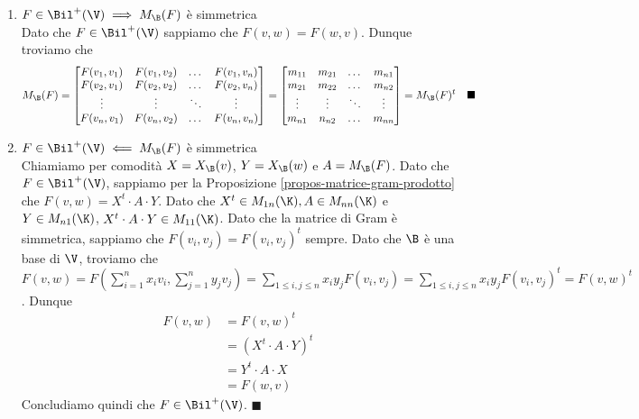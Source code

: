 \documentclass[11pt, a4paper, titlepage, oneside]{scrbook}
\begin{document}
\begin{enumerate}[label=\arabic*°]
    \item $F \in \Bil^+(\V) \implies M_\B(F)$ è simmetrica \\
    Dato che $F \in \Bil^+(\V)$ sappiamo che $F(v,w) = F(w,v)$. Dunque troviamo che 
    \[
    M_\B(F) = \begin{bmatrix}
        F(v_1, v_1) & F(v_1, v_2) & \dots & F(v_1,v_n) \\
        F(v_2, v_1) & F(v_2, v_2) & \dots & F(v_2, v_n) \\
        \vdots & \vdots &\ddots & \vdots \\
        F(v_n, v_1) & F(v_n, v_2) & \dots & F(v_n, v_n)
    \end{bmatrix}
    = \begin{bmatrix}
        m_{11} & m_{21} & \dots & m_{n1} \\
        m_{21} & m_{22} & \dots & m_{n2} \\
        \vdots & \vdots & \ddots & \vdots \\
        m_{n1} & n_{n2} & \dots & m_{nn}
    \end{bmatrix} = M_\B(F)^t \quad \blacksquare
    \]
    \item $F \in \Bil^+(\V) \impliedby M_\B(F)$ è simmetrica \\
    Chiamiamo per comodità $X = X_\B(v)$, $Y = X_\B(w)$ e $A = M_\B(F)$. Dato che $F \in \Bil^+(\V)$, sappiamo per la Proposizione \ref{propos-matrice-gram-prodotto} che $F(v,w) = X^t \cdot A \cdot Y$. Dato che $X^t \in M_{1n}(\K), A \in M_{nn}(\K)$ e $Y \in M_{n1}(\K)$, $X^t \cdot A \cdot Y \in M_{11}(\K)$. Dato che la matrice di Gram è simmetrica, sappiamo che $F(v_i, v_j) = F(v_i, v_j)^t$ sempre. Dato che $\B$ è una base di $\V$, troviamo che \mbox{$F(v,w) = F(\sum_{i = 1}^n x_i v_i, \sum_{j = 1}^n y_j v_j) = \sum_{1 \leq i, j \leq n} x_i y_j F(v_i, v_j) = \sum_{1 \leq i,j \leq n} x_i y_j F(v_i, v_j)^t = F(v,w)^t$}. Dunque
    \begin{align*}
    F(v,w) &= F(v,w)^t \\
    &= (X^t \cdot A \cdot Y)^t \\
    &= Y^t \cdot A \cdot X \\
    &= F(w,v)
    \end{align*}
    Concludiamo quindi che $F \in \Bil^+(\V)$. $\blacksquare$
\end{enumerate}
\end{document}
